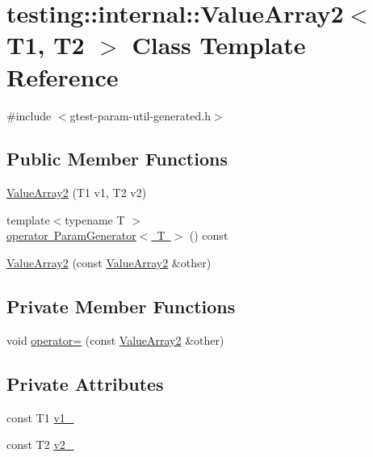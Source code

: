 \hypertarget{classtesting_1_1internal_1_1_value_array2}{}\section{testing\+::internal\+::Value\+Array2$<$ T1, T2 $>$ Class Template Reference}
\label{classtesting_1_1internal_1_1_value_array2}


{\ttfamily \#include $<$gtest-\/param-\/util-\/generated.\+h$>$}

\subsection*{Public Member Functions}
\begin{DoxyCompactItemize}
\item 
\mbox{\hyperlink{classtesting_1_1internal_1_1_value_array2_af641714b9a06929e4dcabe8854d0da1c}{Value\+Array2}} (T1 v1, T2 v2)
\item 
{\footnotesize template$<$typename T $>$ }\\\mbox{\hyperlink{classtesting_1_1internal_1_1_value_array2_aa81899f10bfd345c17aae540acc296a9}{operator Param\+Generator$<$ T $>$}} () const
\item 
\mbox{\hyperlink{classtesting_1_1internal_1_1_value_array2_ac0da580bf4f38494da741c7140a7927d}{Value\+Array2}} (const \mbox{\hyperlink{classtesting_1_1internal_1_1_value_array2}{Value\+Array2}} \&other)
\end{DoxyCompactItemize}
\subsection*{Private Member Functions}
\begin{DoxyCompactItemize}
\item 
void \mbox{\hyperlink{classtesting_1_1internal_1_1_value_array2_a50dca762b20042440ea532503f7e0b71}{operator=}} (const \mbox{\hyperlink{classtesting_1_1internal_1_1_value_array2}{Value\+Array2}} \&other)
\end{DoxyCompactItemize}
\subsection*{Private Attributes}
\begin{DoxyCompactItemize}
\item 
const T1 \mbox{\hyperlink{classtesting_1_1internal_1_1_value_array2_ac046b318215dba521f67369bdb4ce535}{v1\+\_\+}}
\item 
const T2 \mbox{\hyperlink{classtesting_1_1internal_1_1_value_array2_aa90e4945eb1d86d978485db2666d25b1}{v2\+\_\+}}
\end{DoxyCompactItemize}



